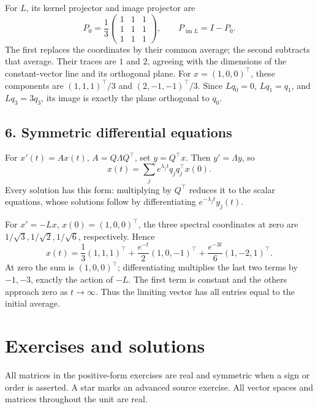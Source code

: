 \begin{example}
For \(L\), its kernel projector and image projector are
\[
 P_0=\frac13\begin{pmatrix}1&1&1\\1&1&1\\1&1&1\end{pmatrix},
 \qquad
 P_{\operatorname{im}L}=I-P_0.
\]
The first replaces the coordinates by their common average; the second
subtracts that average. Their traces are \(1\) and \(2\), agreeing with
the dimensions of the constant-vector line and its orthogonal plane.
For \(x=(1,0,0)^\top\), these components are
\((1,1,1)^\top/3\) and \((2,-1,-1)^\top/3\).
Since \(Lq_0=0\), \(Lq_1=q_1\), and \(Lq_3=3q_3\),
its image is exactly the plane orthogonal to \(q_0\).
\end{example}

\subsection*{6. Symmetric differential equations}
For \(x'(t)=Ax(t)\), \(A=Q\Lambda Q^\top\), set \(y=Q^\top x\).
Then \(y'=\Lambda y\), so
\[
 x(t)=\sum_j e^{\lambda_jt}q_jq_j^\top x(0).
\]
Every solution has this form: multiplying by \(Q^\top\) reduces it to
the scalar equations, whose solutions follow by differentiating
\(e^{-\lambda_jt}y_j(t)\).

For \(x'=-Lx\), \(x(0)=(1,0,0)^\top\), the three spectral coordinates
at zero are \(1/\sqrt3,1/\sqrt2,1/\sqrt6\), respectively. Hence
\[
 x(t)=\frac13(1,1,1)^\top
       +\frac{e^{-t}}2(1,0,-1)^\top
       +\frac{e^{-3t}}6(1,-2,1)^\top.
\]
At zero the sum is \((1,0,0)^\top\); differentiating multiplies the
last two terms by \(-1,-3\), exactly the action of \(-L\).
The first term is constant and the others approach zero as \(t\to\infty\).
Thus the limiting vector has all entries equal to the initial average.

\clearpage
\section*{Exercises and solutions}
All matrices in the positive-form exercises are real and symmetric when
a sign or order is asserted. A star marks an advanced source exercise.
All vector spaces and matrices throughout the unit are real.

